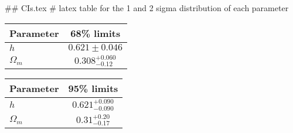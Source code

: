 ## CIs.tex
# latex table for the 1 and 2 sigma distribution of each parameter

\begin{tabular} { l  c}
 Parameter &  68\% limits\\
\hline
{\boldmath$h              $} & $0.621\pm 0.046            $\\
{\boldmath$\Omega_m       $} & $0.308^{+0.060}_{-0.12}    $\\
\hline
\end{tabular}

\begin{tabular} { l  c}
 Parameter &  95\% limits\\
\hline
{\boldmath$h              $} & $0.621^{+0.090}_{-0.090}   $\\
{\boldmath$\Omega_m       $} & $0.31^{+0.20}_{-0.17}      $\\
\hline
\end{tabular}
